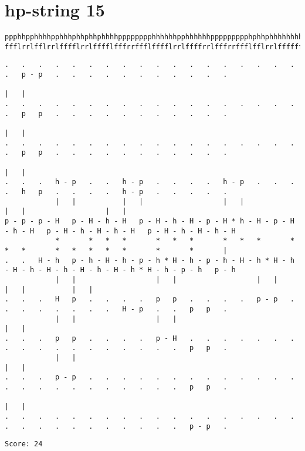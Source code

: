 \documentclass[a4paper,oneside,article,11pt]{memoir}
\begin{document}
\pagebreak

\section*{hp-string 15}
\begin{lstlisting}[basicstyle=\fontsize{6}{11}\ttfamily]
ppphhpphhhhpphhhphhphhphhhhpppppppphhhhhhpphhhhhhppppppppphphhphhhhhhhhhhhpphhhphhphpphphhhpppppphhh
ffflrrlfflrrlfffflrrlfffflfffrrffflfffflrrlffffrrlfffrrffflfflrrlfffffffflrrlfffflfrrflfffflffrrffl
\end{lstlisting}
\begin{lstlisting}[basicstyle=\fontsize{1}{11}\ttfamily]
.   .   .   .   .   .   .   .   .   .   .   .   .   .   .   .   .   .   .   p - p   .   .   .   .   .   .   .   .   .   .   .
                                                                            |   |
.   .   .   .   .   .   .   .   .   .   .   .   .   .   .   .   .   .   .   p   p   .   .   .   .   .   .   .   .   .   .   .
                                                                            |   |
.   .   .   .   .   .   .   .   .   .   .   .   .   .   .   .   .   .   .   p   p   .   .   .   .   .   .   .   .   .   .   .
                                                                            |   |
.   .   .   h - p   .   .   h - p   .   .   .   .   h - p   .   .   .   .   h   p   .   .   .   .   h - p   .   .   .   .   .
            |   |           |   |                   |   |                   |   |                   |   |
p - p - p - H   p - H - h - H   p - H - h - H - p - H * h - H - p - H - h - H   p - H - h - H - h - H   p - H - h - H - h - H
            *       *   *   *       *   *   *       *   *   *       *   *   *       *   *   *   *   *       *       *       |
.   .   H - h   p - h - H - h - p - h * H - h - p - h - H - h * H - h - H - h - H - h - H - h - H - h * H - h - p - h   p - h
            |   |                   |   |                   |   |                                   |   |           |   |
.   .   .   H   p   .   .   .   .   p   p   .   .   .   .   p - p   .   .   .   .   .   .   .   .   H - p   .   .   p   p   .
            |   |                   |   |                                                                           |   |
.   .   .   p   p   .   .   .   .   p - H   .   .   .   .   .   .   .   .   .   .   .   .   .   .   .   .   .   .   p   p   .
            |   |                                                                                                   |   |
.   .   .   p - p   .   .   .   .   .   .   .   .   .   .   .   .   .   .   .   .   .   .   .   .   .   .   .   .   p   p   .
                                                                                                                    |   |
.   .   .   .   .   .   .   .   .   .   .   .   .   .   .   .   .   .   .   .   .   .   .   .   .   .   .   .   .   p - p   .
\end{lstlisting}
\begin{lstlisting}
Score: 24
\end{lstlisting}
\end{document}
